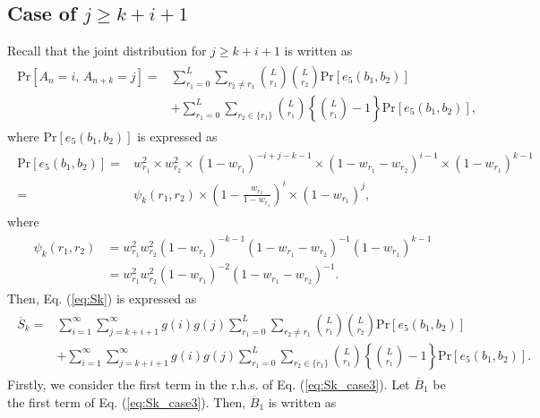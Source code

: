 \subsection{Case of $j \geq k+i+1$}
Recall that the joint distribution for $j \geq k+i+1$ is written as
\begin{align}\begin{split}
  \mathrm{Pr}[A_n=i,\, A_{n+k}=j] 
  =& \sum_{r_1=0}^{L} \sum_{r_2 \neq r_1} \binom{L}{r_1}\binom{L}{r_2}\mathrm{Pr}[e_5(b_1,b_2)] \\
  &+ \sum_{r_1=0}^{L} \sum_{r_2 \in \{r_1\}} \binom{L}{r_1}\left\{\binom{L}{r_1}-1\right\}\mathrm{Pr}[e_5(b_1,b_2)],
\end{split}\end{align}
where $\mathrm{Pr}[e_5(b_1,b_2)]$ is expressed as
\begin{align}\begin{split}
  \mathrm{Pr}[e_5(b_1,b_2)]
  =& w_{r_1}^2  \times w_{r_2}^2 
  \times (1-w_{r_1})^{-i+j-k-1} 
  \times (1-w_{r_1}-w_{r_2})^{i-1}
  \times (1-w_{r_1})^{k-1} \\
  =&\psi_k(r_1,r_2)\times \left(1-\frac{w_{r_2}}{1-w_{r_1}} \right)^{i} \times (1-w_{r_1})^j,
\end{split}\end{align}
%
where
\begin{align}\begin{split}\label{eq:psi_k}
  \psi_k(r_1,r_2) 
  &= w_{r_1}^2 w_{r_2}^2 
    (1-w_{r_1})^{-k-1} 
    (1-w_{r_1}-w_{r_2})^{-1}
    (1-w_{r_1})^{k-1} \\
  &= w_{r_1}^2 w_{r_2}^2 (1-w_{r_1})^{-2} (1-w_{r_1}-w_{r_2})^{-1}.
\end{split}\end{align}
%
Then, Eq. (\ref{eq:Sk}) is expressed as
\begin{align}\begin{split}\label{eq:Sk_case5}
  \overline{S}_k 
  =& \sum_{i=1}^{\infty}\sum_{j=k+i+1}^{\infty} g(i)g(j) \sum_{r_1=0}^{L} \sum_{r_2 \neq r_1} \binom{L}{r_1}\binom{L}{r_2}\mathrm{Pr}[e_5(b_1,b_2)]\\ 
  &+ \sum_{i=1}^{\infty}\sum_{j=k+i+1}^{\infty} g(i)g(j) \sum_{r_1=0}^{L} \sum_{r_2 \in \{r_1\}} \binom{L}{r_1} \left\{\binom{L}{r_1}-1 \right\}\mathrm{Pr}[e_5(b_1,b_2)].
\end{split}\end{align}
%
Firstly, we consider the first term in the r.h.s. of Eq. (\ref{eq:Sk_case3}). Let $\overline{B}_1$ be the first term of Eq. (\ref{eq:Sk_case3}). Then, $\overline{B}_1$ is written as
